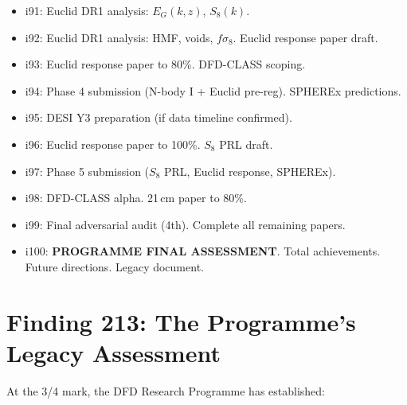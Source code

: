 \documentclass[11pt,a4paper]{article}
\begin{document}
\begin{tcolorbox}[colback=blue!5!white, colframe=dfdblue, title=\textbf{Block 3: Data Confrontation (i91--i95)}]
\begin{itemize}[nosep]
\item i91: Euclid DR1 analysis: $E_G(k,z)$, $S_8(k)$.
\item i92: Euclid DR1 analysis: HMF, voids, $f\sigma_8$. Euclid response paper draft.
\item i93: Euclid response paper to 80\%. DFD-CLASS scoping.
\item i94: Phase 4 submission (N-body I + Euclid pre-reg). SPHEREx predictions.
\item i95: DESI Y3 preparation (if data timeline confirmed).
\end{itemize}
\end{tcolorbox}

\begin{tcolorbox}[colback=blue!5!white, colframe=dfdblue, title=\textbf{Block 4: Final Synthesis (i96--i100)}]
\begin{itemize}[nosep]
\item i96: Euclid response paper to 100\%. $S_8$ PRL draft.
\item i97: Phase 5 submission ($S_8$ PRL, Euclid response, SPHEREx).
\item i98: DFD-CLASS alpha. 21\,cm paper to 80\%.
\item i99: Final adversarial audit (4th). Complete all remaining papers.
\item i100: \textbf{PROGRAMME FINAL ASSESSMENT}. Total achievements. Future directions. Legacy document.
\end{itemize}
\end{tcolorbox}

\section{Finding 213: The Programme's Legacy Assessment}

At the 3/4 mark, the DFD Research Programme has established:
\end{document}
